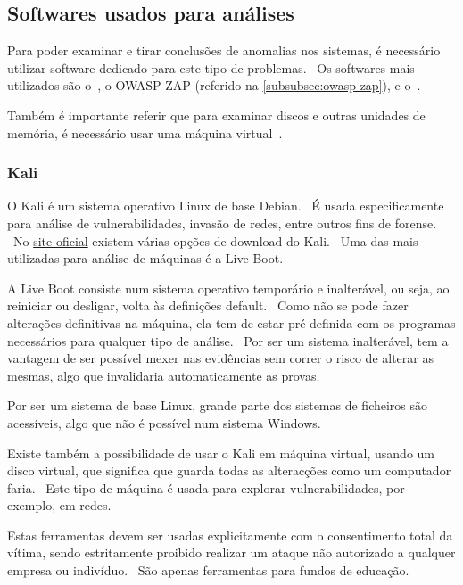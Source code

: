 \documentclass{report}
\begin{document}

\subsection{Softwares usados para análises}
\label{subsec:softwares-usados-para-analises}
Para poder examinar e tirar conclusões de anomalias nos sistemas, é necessário utilizar software dedicado para este tipo de problemas. \ Os softwares mais utilizados são o~, o OWASP-ZAP (referido na \autoref{subsubsec:owasp-zap}), e o~. \par
Também é importante referir que para examinar discos e outras unidades de memória, é necessário usar uma máquina virtual~. \par

\subsubsection{Kali}
\label{subsubsec:kali}
O Kali é um sistema operativo Linux de base Debian. \ É usada especificamente para análise de vulnerabilidades, invasão de redes, entre outros fins de forense. \  No \href{https://www.kali.org/get-kali/}{site oficial} existem várias opções de download do Kali. \ Uma das mais utilizadas para análise de máquinas é a Live Boot. \bigskip

A Live Boot consiste num sistema operativo temporário e inalterável, ou seja, ao reiniciar ou desligar, volta às definições default. \ Como não se pode fazer alterações definitivas na máquina, ela tem de estar pré-definida com os programas necessários para qualquer tipo de análise. \ Por ser um sistema inalterável, tem a vantagem de ser possível mexer nas evidências sem correr o risco de alterar as mesmas, algo que invalidaria automaticamente as provas. \par
Por ser um sistema de base Linux, grande parte dos sistemas de ficheiros são acessíveis, algo que não é possível num sistema Windows. \bigskip

Existe também a possibilidade de usar o Kali em  máquina virtual, usando um disco virtual, que significa que guarda todas as alteracções como um computador faria. \ Este tipo de máquina é usada para explorar vulnerabilidades, por exemplo, em redes. \par
Estas ferramentas devem ser usadas explicitamente com o consentimento total da vítima, sendo estritamente proibido realizar um ataque não autorizado a qualquer empresa ou indivíduo. \ São apenas ferramentas para fundos de educação.
\end{document}
